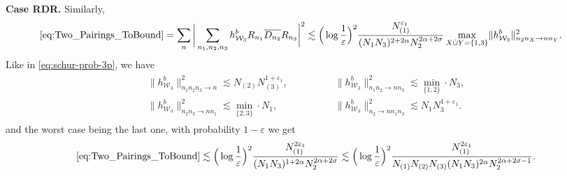 \documentclass[11pt, xcolor = dvipsnames,reqno
]{amsart}
\theoremstyle{definition}
\theoremstyle{remark}
\begin{document}
    \noindent
    \textbf{Case RDR. }
    Similarly, 
    \begin{align*}
        \eqref{eq:Two_Pairings_ToBound}
        = \sum_n \bigg| \sum_{n_1,n_2,n_3} h^b_{\mathcal{W}_3}    R_{n_1} \overline{D_{n_2}} R_{n_3} \bigg|^2   
        & \lesssim  \Big(  \log \frac{1}{\varepsilon} \Big)^2\frac{  N_{(1)}^{\varepsilon_1}}{ (N_1 N_3)^{2 + 2\alpha} N_2^{2\alpha + 2\sigma}} \max_{X \dot\cup Y = \{1,3\}} \lVert h^b_{\mathcal{W}_3} \rVert_{n_2n_X \to nn_Y}^2.
    \end{align*}
    Like in \eqref{eq:schur-prob-3p}, we have
    \begin{align}\label{eq:schur-prob-3p_2}
    \begin{array}{ll}
        \lVert h^b_{\mathcal{W}_3} \rVert_{n_1n_2n_3 \to n}^2
            \lesssim N_{(2)} N_{(3)}^{1+\varepsilon_1}, & \qquad \qquad \lVert h^b_{\mathcal{W}_3} \rVert_{n_1n_2 \to nn_3}^2 \lesssim \operatorname{min}_{\{1,2\}} \cdot N_3, \\
         \lVert h^b_{\mathcal{W}_3} \rVert_{n_2n_3 \to nn_1}^2 \lesssim    \operatorname{min}_{\{2,3\}} \cdot N_1, & \qquad \qquad \lVert h^b_{\mathcal{W}_3} \rVert_{n_2 \to nn_1n_3}^2 \lesssim N_1 N_3^{1+\varepsilon_1}.
    \end{array}
    \end{align}
    and the worst case being the last one, with probability $1 - \varepsilon$ we get
        \begin{align*}
        \eqref{eq:Two_Pairings_ToBound}
        \lesssim \Big(\log \frac{1}{\varepsilon} \Big)^2 \frac{N_{(1)}^{2\varepsilon_1}}{(N_1N_3)^{1 + 2\alpha} N_2^{2\alpha + 2\sigma} }
        \lesssim \Big(\log \frac{1}{\varepsilon} \Big)^2 \frac{N_{(1)}^{2\varepsilon_1}}{N_{(1)}N_{(2)}N_{(3)}(N_1N_3)^{2\alpha} N_2^{2\alpha + 2\sigma - 1}}.
        \end{align*}
\end{document}
